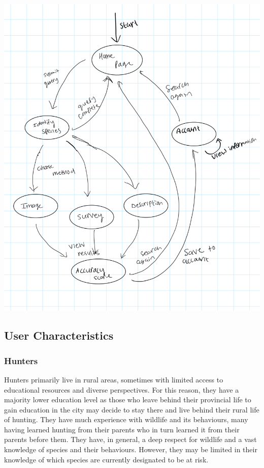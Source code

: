 \documentclass[]{article}
\begin{document}
\includegraphics[scale=0.25]{2.2StateDiagram.jpg}

\subsection{User Characteristics}
\label{sub:user_characteristics}
\subsubsection{Hunters}
Hunters primarily live in rural areas, sometimes with limited access to educational resources and diverse perspectives. For this reason, they have a majority lower education level 
as those who leave behind their provincial life to gain education in the city may decide to stay there and live behind their rural life of hunting. They have much experience with
 wildlife and its behaviours, many having learned hunting from their parents who in turn learned it from their parents before them. They have, in general,
 a deep respect for wildlife and a vast knowledge of species and their behaviours. However, they may be limited in their knowledge of which species are 
 currently designated to be at risk.
\end{document}
